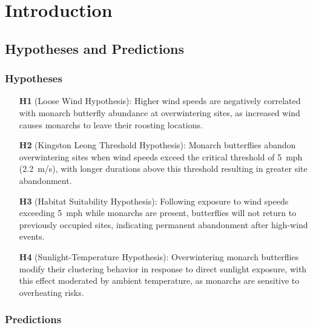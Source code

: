 \chapter{Introduction}
\label{ch:introduction}

\section{Hypotheses and Predictions}

\subsection*{Hypotheses}

\begin{enumerate}
    \item[\textbf{H1} (Loose Wind Hypothesis):] Higher wind speeds are negatively correlated with monarch butterfly abundance at overwintering sites, as increased wind causes monarchs to leave their roosting locations.
    \item[\textbf{H2} (Kingston Leong Threshold Hypothesis):] Monarch butterflies abandon overwintering sites when wind speeds exceed the critical threshold of 5~mph (2.2~m/s), with longer durations above this threshold resulting in greater site abandonment.
    \item[\textbf{H3} (Habitat Suitability Hypothesis):] Following exposure to wind speeds exceeding 5~mph while monarchs are present, butterflies will not return to previously occupied sites, indicating permanent abandonment after high-wind events.
    \item[\textbf{H4} (Sunlight-Temperature Hypothesis):] Overwintering monarch butterflies modify their clustering behavior in response to direct sunlight exposure, with this effect moderated by ambient temperature, as monarchs are sensitive to overheating risks.
\end{enumerate}

\subsection*{Predictions}

